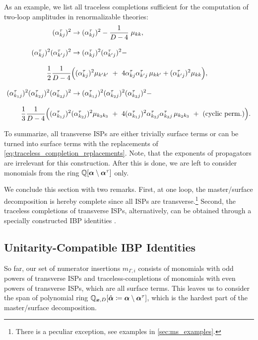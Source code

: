 As an example, we list all traceless completions sufficient for the computation of two-loop amplitudes in renormalizable theories:
\begin{equation}
  \label{eq:traceless_completion_replacements}
  \addtolength{\jot}{2ex}
  \begin{aligned}
    (\alpha_{kj}^{\tau})^2 &\to (\alpha_{kj}^{\tau})^2 - \frac{1}{D-4}\;\mu_{kk}, \\
    (\alpha_{kj}^{\tau})^2(\alpha_{k^\prime j}^{\tau})^2 &\to (\alpha_{kj}^{\tau})^2(\alpha_{k^\prime j}^{\tau})^2 - \\
    \frac{1}{2} \frac{1}{D-4} &
    \qty\Big(
    (\alpha_{kj}^{\tau})^2 \mu_{k^\prime k^\prime} ~+~ 4 \alpha_{kj}^{\tau}\alpha_{k^\prime j}^{\tau} \, \mu_{k k^\prime} + (\alpha_{k^\prime j}^{\tau})^2 \mu_{k k}
    ), \\ 
    (\alpha_{k_1j}^{\tau})^2(\alpha_{k_2 j}^{\tau})^2 (\alpha_{k_3 j}^{\tau})^2&\to (\alpha_{k_1j}^{\tau})^2(\alpha_{k_2 j}^{\tau})^2 (\alpha_{k_3 j}^{\tau})^2 - \\ 
    \frac{1}{3}\frac{1}{D-4} 
    \Big(
    (\alpha_{k_1j}^{\tau})^2 &(\alpha_{k_2j}^{\tau})^2 \mu_{k_3 k_3} ~+~ 4 (\alpha_{k_1j}^{\tau})^2 \alpha_{k_2j}^{\tau} \alpha_{k_3j}^{\tau}\,\mu_{k_2 k_3} ~+~(\text{cyclic perm.})
    \Big).
  \end{aligned}
\end{equation}

To summarize, all transverse ISPs are either trivially surface terms or can be turned into surface terms with the replacements of \cref{eq:traceless_completion_replacements}.
Note, that the exponents of propagators are irrelevant for this construction.
After this is done, we are left to consider monomials from the ring $\mathbb{Q}[\vb*{\alpha}\setminus\vb*{\alpha}^\tau]$ only.


We conclude this section with two remarks.
First, at one loop, the master/surface decomposition is hereby complete since all ISPs are transverse.\footnote{%
  There is a peculiar exception, see examples in \cref{sec:ms_examples}.
}
Second, the traceless completions of transverse ISPs, alternatively,
can be obtained through a specially constructed IBP identities \cite{Ita:2015tya}.



\subsection{Unitarity-Compatible IBP Identities}
\label{sec:unitarity_compatible_ibps}
So far, our set of numerator insertions $m_{\Gamma,i}$ consists of monomials with odd powers of transverse ISPs and traceless-completions of
monomials with even powers of transverse ISPs, which are all surface terms.
This leaves us to consider the span of polynomial ring $\mathbb{Q}_{\vb*{x},D}[\hat{\vb*{\alpha}}\coloneqq \vb*{\alpha}\setminus\vb*{\alpha}^\tau]$,
which is the hardest part of the master/surface decomposition.

